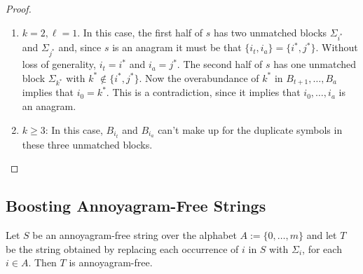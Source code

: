 \documentclass[kpfonts]{patmorin}
\begin{document}
\begin{proof}
\begin{enumerate}
        \item $k=2,\ell=1$.  In this case, the first half of $s$ has two unmatched blocks $\Sigma_{i^*}$ and $\Sigma_{j^*}$ and, since $s$ is an anagram it must be that $\{i_t,i_a\}=\{i^*,j^*\}$.  Without loss of generality, $i_t=i^*$ and $i_a=j^*$.  The second half of $s$ has one unmatched block $\Sigma_{k^*}$ with $k^*\not\in\{i^*,j^*\}$.  Now the overabundance of $k^*$ in $B_{t+1},\ldots,B_{a}$ implies that $i_0=k^*$.  This is a contradiction, since it implies that $i_0,\ldots,i_a$ is an anagram.

        \item $k\ge 3$:  In this case, $B_{i_t}$ and $B_{i_a}$ can't make up for the duplicate symbols in these three unmatched blocks.
        \qedhere
    \end{enumerate}
\end{proof}


\subsection{Boosting Annoyagram-Free Strings}

\begin{lem}\label{blow_up_af}
    Let $S$ be an annoyagram-free string over the alphabet $A:=\{0,\ldots,m\}$ and let $T$ be the string obtained by replacing each occurrence of $i$ in $S$ with $\Sigma_i$, for each $i\in A$.  Then $T$ is annoyagram-free.
\end{lem}
\end{document}
